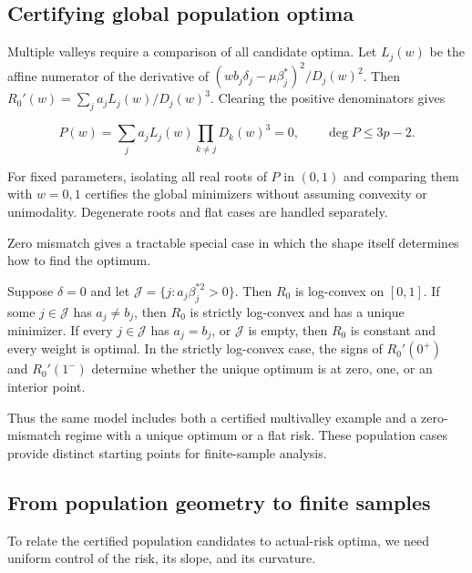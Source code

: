 \subsection{Certifying global population optima}
\label{sec:global-certification}

Multiple valleys require a comparison of all candidate optima. Let $L_j(w)$ be the affine numerator of the derivative of $(wb_j\delta_j-\mu\beta_j^*)^2/D_j(w)^2$. Then $R_0'(w)=\sum_j a_jL_j(w)/D_j(w)^3$. Clearing the positive denominators gives

\begin{equation}
 P(w)=\sum_j a_jL_j(w)\prod_{k\ne j}D_k(w)^3=0,
 \qquad \deg P\le3p-2.
 \label{eq:stationary-polynomial}
\end{equation}

For fixed parameters, isolating all real roots of $P$ in $(0,1)$ and comparing them with $w=0,1$ certifies the global minimizers without assuming convexity or unimodality. Degenerate roots and flat cases are handled separately.

Zero mismatch gives a tractable special case in which the shape itself determines how to find the optimum.

\begin{proposition}\label{prop:delta-zero-shape}
Suppose $\delta=0$ and let $\mathcal J=\{j:a_j\beta_j^{*2}>0\}$. Then $R_0$ is log-convex on $[0,1]$. If some $j\in\mathcal J$ has $a_j\ne b_j$, then $R_0$ is strictly log-convex and has a unique minimizer. If every $j\in\mathcal J$ has $a_j=b_j$, or $\mathcal J$ is empty, then $R_0$ is constant and every weight is optimal. In the strictly log-convex case, the signs of $R_0'(0^+)$ and $R_0'(1^-)$ determine whether the unique optimum is at zero, one, or an interior point.
\end{proposition}

Thus the same model includes both a certified multivalley example and a zero-mismatch regime with a unique optimum or a flat risk. These population cases provide distinct starting points for finite-sample analysis.

\subsection{From population geometry to finite samples}
\label{sec:finite-selection}

To relate the certified population candidates to actual-risk optima, we need uniform control of the risk, its slope, and its curvature.


